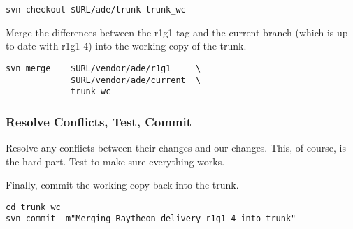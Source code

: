 \begin{verbatim}
svn checkout $URL/ade/trunk trunk_wc
\end{verbatim}

Merge the differences between the r1g1 tag and the current branch
(which is up to date with r1g1-4) into the working copy of the trunk.

\begin{verbatim}
svn merge    $URL/vendor/ade/r1g1     \
             $URL/vendor/ade/current  \
             trunk_wc
\end{verbatim}

\subsubsection{Resolve Conflicts, Test, Commit}

Resolve any conflicts between their changes and our changes.
This, of course, is the hard part.  Test to make sure everything 
works.

Finally, commit the working copy back into the trunk.

\begin{verbatim}
cd trunk_wc
svn commit -m"Merging Raytheon delivery r1g1-4 into trunk"
\end{verbatim}



